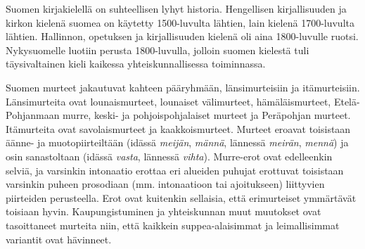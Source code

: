 \documentclass[]{../../metanetpaper}
\begin{document}
\begin{Parallel}[c]{70mm}{70mm}
{Suomen kirjakielellä on suhteellisen lyhyt historia. Hengellisen kirjallisuuden
ja kirkon kielenä suomea on käytetty 1500-luvulta lähtien, lain kielenä
1700-luvulta lähtien. Hallinnon, opetuksen ja kirjallisuuden kielenä oli aina
1800-luvulle ruotsi. Nykysuomelle luotiin perusta 1800-luvulla, jolloin suomen
kielestä tuli täysivaltainen kieli kaikessa yhteiskunnallisessa toiminnassa.

Suomen murteet jakautuvat kahteen pääryhmään, länsimurteisiin ja itämurteisiin.
Länsimurteita ovat lounaismurteet, lounaiset välimurteet, hämäläismurteet,
Etelä-Pohjanmaan murre, keski- ja pohjoispohjalaiset murteet ja Peräpohjan
murteet. Itämurteita ovat savolaismurteet ja kaakkoismurteet. Murteet eroavat
toisistaan äänne- ja muotopiirteiltään (idässä \textit{meijän}, \textit{männä}, lännessä \textit{meirän},
\textit{mennä}) ja osin sanastoltaan (idässä \textit{vasta}, lännessä \textit{vihta}). Murre-erot ovat
edelleenkin selviä, ja varsinkin intonaatio erottaa eri alueiden puhujat
erottuvat toisistaan varsinkin puheen prosodiaan (mm. intonaatioon tai
ajoitukseen) liittyvien piirteiden perusteella. Erot ovat kuitenkin sellaisia,
että erimurteiset ymmärtävät toisiaan hyvin. Kaupungistuminen ja yhteiskunnan
muut muutokset ovat tasoittaneet murteita niin, että kaikkein suppea-alaisimmat
ja leimallisimmat variantit ovat hävinneet.
}

\end{Parallel}
\end{document}
